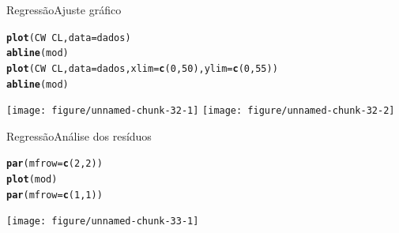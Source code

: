 \documentclass[10pt]{beamer}\usepackage[]{graphicx}\usepackage[]{color}
\makeatletter
\newcommand{\hlnum}[1]{\textcolor[rgb]{0.686,0.059,0.569}{#1}}%
\newcommand{\hlopt}[1]{\textcolor[rgb]{0,0,0}{#1}}%
\newcommand{\hlstd}[1]{\textcolor[rgb]{0.345,0.345,0.345}{#1}}%
\newcommand{\hlkwc}[1]{\textcolor[rgb]{0.333,0.667,0.333}{#1}}%
\newcommand{\hlkwd}[1]{\textcolor[rgb]{0.737,0.353,0.396}{\textbf{#1}}}%
\newenvironment{kframe}{%
 \def\at@end@of@kframe{}%
 \ifinner\ifhmode%
  \def\at@end@of@kframe{\end{minipage}}%
  \begin{minipage}{\columnwidth}%
 \fi\fi%
 \def\FrameCommand##1{\hskip\@totalleftmargin \hskip-\fboxsep
 \colorbox{shadecolor}{##1}\hskip-\fboxsep
     \hskip-\linewidth \hskip-\@totalleftmargin \hskip\columnwidth}%
 \MakeFramed {\advance\hsize-\width
   \@totalleftmargin\z@ \linewidth\hsize
   \@setminipage}}%
 {\par\unskip\endMakeFramed%
 \at@end@of@kframe}
\newenvironment{knitrout}{}{} %
\theoremstyle{definition}
\makeatother
\begin{document}
\begin{frame}[fragile=singleslide]{Regressão}{Ajuste gráfico}
\begin{knitrout}\small
{}\color{fgcolor}\begin{kframe}
\begin{alltt}
\hlkwd{plot}\hlstd{(CW} \hlopt{~} \hlstd{CL,} \hlkwc{data} \hlstd{= dados)}
\hlkwd{abline}\hlstd{(mod)}
\hlkwd{plot}\hlstd{(CW} \hlopt{~} \hlstd{CL,} \hlkwc{data} \hlstd{= dados,} \hlkwc{xlim} \hlstd{=} \hlkwd{c}\hlstd{(}\hlnum{0}\hlstd{,}\hlnum{50}\hlstd{),} \hlkwc{ylim} \hlstd{=} \hlkwd{c}\hlstd{(}\hlnum{0}\hlstd{,}\hlnum{55}\hlstd{))}
\hlkwd{abline}\hlstd{(mod)}
\end{alltt}
\end{kframe}

{\centering \texttt{[image: figure/unnamed-chunk-32-1]} 
\texttt{[image: figure/unnamed-chunk-32-2]} 

}



\end{knitrout}
\end{frame}

\begin{frame}[fragile=singleslide]{Regressão}{Análise dos resíduos}
\begin{knitrout}\small
{}\color{fgcolor}\begin{kframe}
\begin{alltt}
\hlkwd{par}\hlstd{(}\hlkwc{mfrow} \hlstd{=} \hlkwd{c}\hlstd{(}\hlnum{2}\hlstd{,}\hlnum{2}\hlstd{))}
\hlkwd{plot}\hlstd{(mod)}
\hlkwd{par}\hlstd{(}\hlkwc{mfrow} \hlstd{=} \hlkwd{c}\hlstd{(}\hlnum{1}\hlstd{,}\hlnum{1}\hlstd{))}
\end{alltt}
\end{kframe}

{\centering \texttt{[image: figure/unnamed-chunk-33-1]} 

}



\end{knitrout}
\end{frame}
\end{document}
